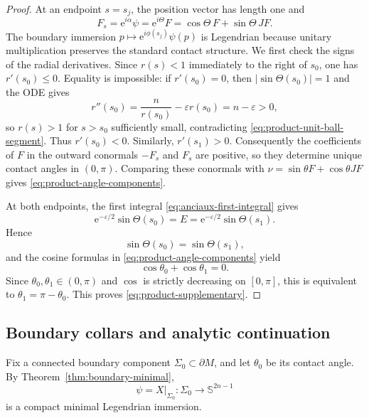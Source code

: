 \documentclass[11pt,a4paper]{article}
\numberwithin{equation}{section}
\newcommand{\Sph}{\mathbb S}
\newcommand{\ee}{\mathrm e}
\begin{document}
\begin{proof}
At an endpoint $s=s_j$, the position vector has length one and
$$
        F_s
        =\ee^{i\alpha}\psi
        =\ee^{i\Theta}F
        =\cos\Theta\,F+\sin\Theta\,JF.
$$
The boundary immersion $p\mapsto\ee^{i\phi(s_j)}\psi(p)$ is Legendrian because
unitary multiplication preserves the standard contact structure.  We first
check the signs of the radial derivatives.  Since $r(s)<1$ immediately to the
right of $s_0$, one has $r'(s_0)\le0$.  Equality is impossible: if
$r'(s_0)=0$, then $|\sin\Theta(s_0)|=1$ and the ODE gives
$$
        r''(s_0)=\frac n{r(s_0)}-\varepsilon r(s_0)=n-\varepsilon>0,
$$
so $r(s)>1$ for $s>s_0$ sufficiently small, contradicting
\eqref{eq:product-unit-ball-segment}.  Thus $r'(s_0)<0$.
Similarly, $r'(s_1)>0$.  Consequently the
coefficients of $F$ in the outward conormals $-F_s$ and $F_s$ are positive,
so they determine unique contact angles in $(0,\pi)$.  Comparing these
conormals with $\nu=\sin\theta F+\cos\theta JF$ gives
\eqref{eq:product-angle-components}.

At both endpoints, the first integral \eqref{eq:anciaux-first-integral} gives
$$
        \ee^{-\varepsilon/2}\sin\Theta(s_0)
        =E
        =\ee^{-\varepsilon/2}\sin\Theta(s_1).
$$
Hence $$\sin\Theta(s_0)=\sin\Theta(s_1),$$ and the cosine formulas in
\eqref{eq:product-angle-components} yield
$$\cos\theta_0+\cos\theta_1=0.$$  Since
$\theta_0,\theta_1\in(0,\pi)$ and $\cos$ is strictly decreasing on
$[0,\pi]$, this is equivalent to $\theta_1=\pi-\theta_0$.  This proves
\eqref{eq:product-supplementary}.
\end{proof}

\subsection{Boundary collars and analytic continuation}

Fix a connected boundary component $\Sigma_0\subset\partial M$, and let $\theta_0$ be its contact angle.  By Theorem~\ref{thm:boundary-minimal},
\begin{equation}
        \psi=X|_{\Sigma_0}:\Sigma_0\longrightarrow\Sph^{2n-1}
\end{equation}
is a compact minimal Legendrian immersion.
\end{document}
